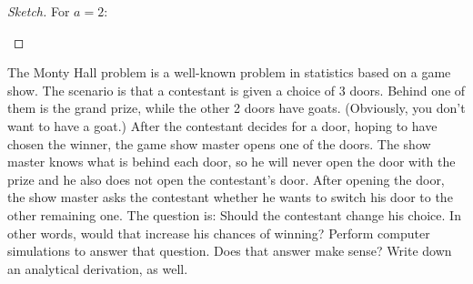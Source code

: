 \documentclass[10pt, physics, diagram]{homework}
\begin{document}
	\begin{proof}[Sketch]
		For $a = 2$:
		\begin{center}
		\end{center}
	\end{proof}

	\begin{problem}[12pts]
		The Monty Hall problem is a well-known problem in statistics based on a game show. The scenario is that a contestant is given a choice of 3 doors. Behind one of them is the grand prize, while the other 2 doors have goats. (Obviously, you don’t want to have a goat.) After the contestant decides for a door, hoping to have chosen the winner, the game show master opens one of the doors. The show master knows what is behind each door, so he will never open the door with the prize and he also does not open the contestant’s door. After opening the door, the show master asks the contestant whether he wants to switch his door to the other remaining one. The question is: Should the contestant change his choice. In other words, would that increase his chances of winning? Perform computer simulations to answer that question. Does that answer make sense? Write down an analytical derivation, as well.
	\end{problem}
\end{document}
